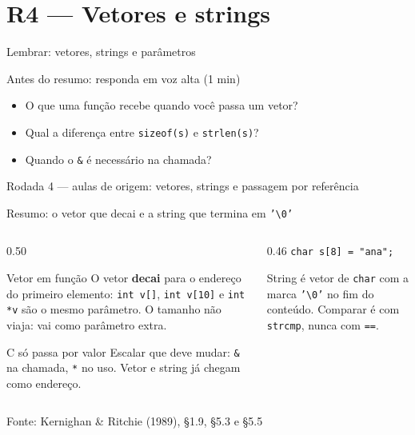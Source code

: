 \documentclass[aspectratio=169]{beamer}
\newcommand{\fonte}[1]{\vfill\hfill{\scriptsize\textcolor{UFSGray}{Fonte: #1}}}
\newcommand{\rodada}[4]{%
  \begin{frame}{Lembrar: #2}
    \begin{block}{Antes do resumo: responda em voz alta (1 min)}
      #4
    \end{block}
    \vfill
    {\small\textcolor{UFSGray}{Rodada #1 --- aulas de origem:} #3}
  \end{frame}}
\begin{document}
\section{R4 --- Vetores e strings}

\rodada{4}{vetores, strings e parâmetros}{vetores, strings e passagem por referência}{
  \begin{itemize}
    \item O que uma função recebe quando você passa um vetor?
    \item Qual a diferença entre \texttt{sizeof(s)} e \texttt{strlen(s)}?
    \item Quando o \texttt{\&} é necessário na chamada?
  \end{itemize}}

\begin{frame}{Resumo: o vetor que decai e a string que termina em \texttt{'\textbackslash 0'}}
  \begin{columns}[T]
    \begin{column}{0.50\textwidth}
      \begin{block}{Vetor em função}
        \small O vetor \textbf{decai} para o endereço do primeiro elemento:
        \texttt{int v[]}, \texttt{int v[10]} e \texttt{int *v} são o mesmo
        parâmetro. O tamanho não viaja: vai como parâmetro extra.
      \end{block}
      \begin{block}{C só passa por valor}
        \small Escalar que deve mudar: \texttt{\&} na chamada, \texttt{*} no
        uso. Vetor e string já chegam como endereço.
      \end{block}
    \end{column}
    \begin{column}{0.46\textwidth}
      \small\texttt{char s[8] = "ana";}
      \begin{center}
      \end{center}
      \small String é vetor de \texttt{char} com a marca
      \texttt{'\textbackslash 0'} no fim do conteúdo. Comparar é com
      \texttt{strcmp}, nunca com \texttt{==}.
    \end{column}
  \end{columns}
  \fonte{Kernighan \& Ritchie (1989), §1.9, §5.3 e §5.5~\cite{kernighan1989c}}
\end{frame}
\end{document}
